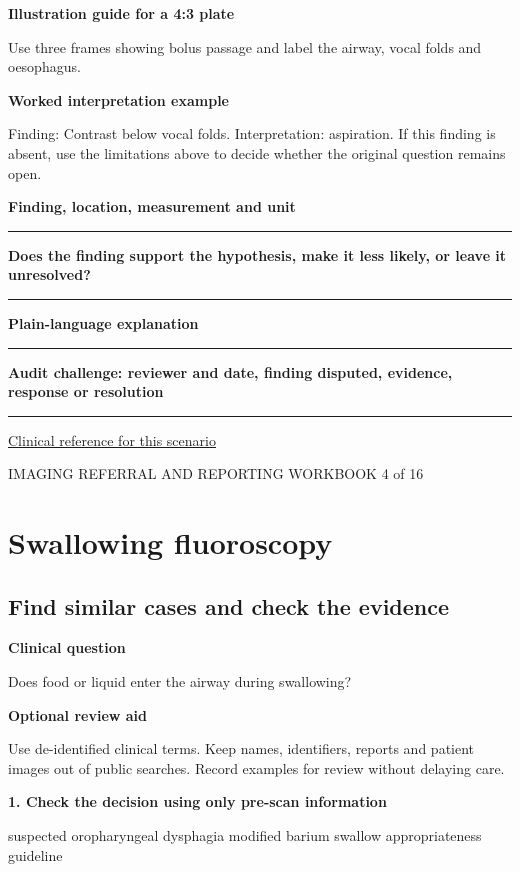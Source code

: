 \documentclass[11pt,a4paper]{article}
\newcommand{\record}[1]{\textbf{#1}\par\vspace{0.55\baselineskip}\hrule\vspace{0.35\baselineskip}}
\begin{document}
\textbf{Illustration guide for a 4:3 plate}\par Use three frames showing bolus passage and label the airway, vocal folds and oesophagus.\par

\textbf{Worked interpretation example}\par Finding: Contrast below vocal folds. Interpretation: aspiration. If this finding is absent, use the limitations above to decide whether the original question remains open.\par

\record{Finding, location, measurement and unit}

\record{Does the finding support the hypothesis, make it less likely, or leave it unresolved?}

\record{Plain-language explanation}

\record{Audit challenge: reviewer and date, finding disputed, evidence, response or resolution}

\small\href{https://acsearch.acr.org/docs/69471/Narrative}{Clinical reference for this scenario}

\normalsize

\newpage

{\small IMAGING REFERRAL AND REPORTING WORKBOOK \hfill 4 of 16}

\section*{Swallowing fluoroscopy}

\subsection*{Find similar cases and check the evidence}

\textbf{Clinical question}\par Does food or liquid enter the airway during swallowing?\par

\textbf{Optional review aid}\par Use de-identified clinical terms. Keep names, identifiers, reports and patient images out of public searches. Record examples for review without delaying care.\par

\textbf{1. Check the decision using only pre-scan information}\par suspected oropharyngeal dysphagia modified barium swallow appropriateness guideline\par
\end{document}
